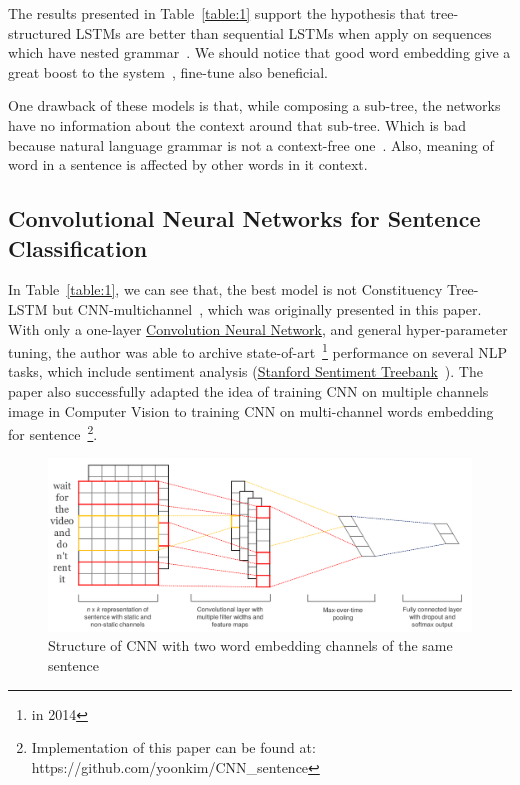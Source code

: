 The results presented in Table~\ref{table:1} support the hypothesis that tree-structured LSTMs are better than sequential LSTMs when apply on sequences which have nested grammar~\cite{treeVSseq}. 
We should notice that good word embedding give a great boost to the system~\cite{Luong_betterword}, fine-tune also beneficial.

One drawback of these models is that, while composing a sub-tree, the networks have no information about the context around that sub-tree.
Which is bad because natural language grammar is not a context-free one~\cite{noContextFree}.
Also, meaning of word in a sentence is affected by other words in it context.

\subsection{Convolutional Neural Networks for Sentence Classification}
In Table~\ref{table:1}, we can see that, the best model is not Constituency Tree-LSTM but CNN-multichannel~\cite{KimCNN}, which was originally presented in this paper. 
With only a one-layer \hyperref[sec:cnn]{Convolution Neural Network}, and general hyper-parameter tuning, the author was able to archive state-of-art~\footnote{in 2014} performance on several NLP tasks, which include sentiment analysis (\hyperref[sec:sst]{Stanford Sentiment Treebank}~\cite{socher2013recursive}). 
The paper also successfully adapted the idea of training CNN on multiple channels image in Computer Vision to training CNN on multi-channel words embedding for sentence~\footnote{Implementation of this paper can be found at: https://github.com/yoonkim/CNN\_sentence}.

\begin{figure}[H]
	\centering
	\includegraphics[scale=0.33]{figure/sentencecnn}
	\caption{Structure of CNN with two word embedding channels of the same sentence}
	\label{fig:multi-cnn}
\end{figure}


